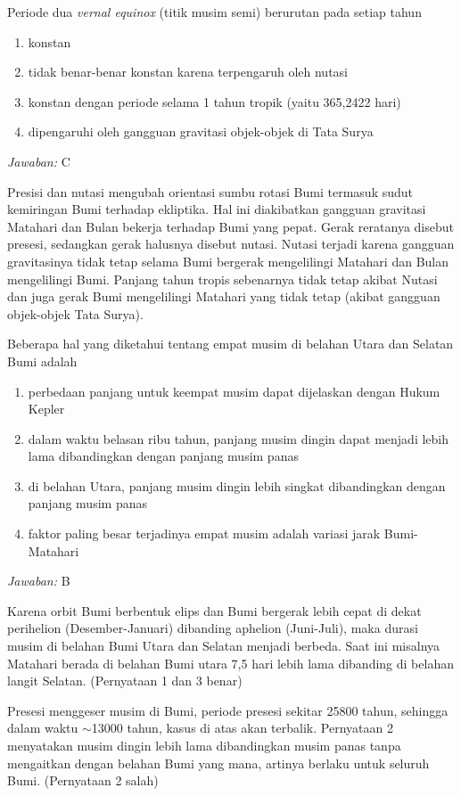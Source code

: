 \documentclass[11pt,fleqn]{exam}
\begin{document}
\begin{questions}
\question Periode dua \textit{vernal equinox} (titik musim semi) berurutan pada setiap tahun
\begin{enumerate}
\item konstan
\item tidak benar-benar konstan karena terpengaruh oleh nutasi
\item konstan dengan periode selama 1 tahun tropik (yaitu 365,2422 hari)
\item dipengaruhi oleh gangguan gravitasi objek-objek di Tata Surya
\end{enumerate}


\textit{Jawaban: }C

Presisi dan nutasi mengubah orientasi sumbu rotasi Bumi termasuk sudut kemiringan Bumi terhadap ekliptika. Hal ini diakibatkan gangguan gravitasi Matahari dan Bulan bekerja terhadap Bumi yang pepat. Gerak reratanya disebut presesi, sedangkan gerak halusnya disebut nutasi. Nutasi terjadi karena gangguan gravitasinya tidak tetap selama Bumi bergerak mengelilingi Matahari dan Bulan mengelilingi Bumi. Panjang tahun tropis sebenarnya tidak tetap akibat Nutasi dan juga gerak Bumi mengelilingi Matahari yang tidak tetap (akibat gangguan objek-objek Tata Surya).


\vspace{0.5cm}
\question Beberapa hal yang diketahui tentang empat musim di belahan Utara dan Selatan Bumi adalah
\begin{enumerate}
\item perbedaan panjang untuk keempat musim dapat dijelaskan dengan Hukum Kepler
\item dalam waktu belasan ribu tahun, panjang musim dingin dapat menjadi lebih lama dibandingkan dengan panjang musim panas
\item di belahan Utara, panjang musim dingin lebih singkat dibandingkan dengan panjang musim panas
\item faktor paling besar terjadinya empat musim adalah variasi jarak Bumi-Matahari
\end{enumerate}


\textit{Jawaban: }B


Karena orbit Bumi berbentuk elips dan Bumi bergerak lebih cepat di dekat perihelion (Desember-Januari) dibanding aphelion (Juni-Juli), maka durasi musim di belahan Bumi Utara dan Selatan menjadi berbeda. Saat ini misalnya Matahari berada di belahan Bumi utara 7,5 hari lebih lama dibanding di belahan langit Selatan. (Pernyataan 1 dan 3 benar)

Presesi menggeser musim di Bumi, periode presesi sekitar 25800 tahun, sehingga dalam waktu $\sim$13000 tahun, kasus di atas akan terbalik. Pernyataan 2 menyatakan musim dingin lebih lama dibandingkan musim panas tanpa mengaitkan dengan belahan Bumi yang mana, artinya berlaku untuk seluruh Bumi. (Pernyataan 2 salah)



\end{questions}
\end{document}
